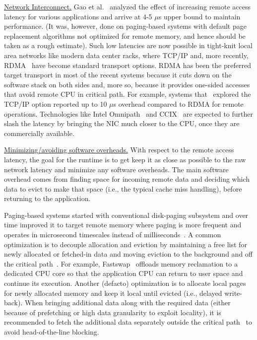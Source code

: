 \vspace{5pt}
\noindent \uline{Network Interconnect.}
Gao et al.~\cite{netdisagg} analyzed the effect of increasing
remote access latency for various applications and arrive at 
4-5 $\mu$s upper bound to maintain performance. (It was, 
however, done on paging-based systems with default page 
replacement algorithms not optimized for remote memory, and 
hence should be taken as a rough estimate).
Such low latencies are now possible in tight-knit
local area networks like modern data center racks,  
where TCP/IP and, more recently, RDMA~\cite{rocev2} have
become standard transport options. 
RDMA has been the preferred target transport 
in most of the recent systems because it cuts down on the 
software stack on both sides and, more so, because it 
provides one-sided accesses that avoid remote CPU in 
critical path. For example, systems that~\cite{literdma,aifm}
explored the TCP/IP option reported up to 10 $\mu$s overhead 
compared to RDMA for remote operations. Technologies 
like Intel Omnipath~\cite{omnipath} and CCIX~\cite{ccix}
are expected to further slash the latency by bringing the NIC 
much closer to the CPU, once they are commercially available. 




\vspace{5pt}
\noindent \uline{Minimizing/avoiding software overheads.}
With respect to the remote access latency, the goal for the 
runtime is to get keep it as close as possible to the raw network 
latency and minimize any software overheads. The main software 
overhead comes from finding space for incoming remote data 
and deciding which data to evict to make that space 
(i.e., the typical cache miss handling), before returning to 
the application. 

Paging-based systems started with conventional disk-paging 
subsystem and over time improved it to target remote memory
where paging is more frequent and operates in microsecond
timescales instead of milliseconds~\cite{Lim2012}. A common 
optimization is to decouple allocation and eviction by 
maintaining a free list for newly allocated or fetched-in 
data and moving eviction to the background and off the 
critical path~\cite{Lim2012,leap}. 
For example, Fastswap~\cite{fastswap} offloads  
memory reclamation to a dedicated CPU core so that the 
application CPU can return to user space and continue its 
execution. Another (defacto) optimization is to allocate local 
pages for newly allocated memory and keep it local until evicted
(i.e., delayed write-back).
When bringing additional data along with the required data
(either because of prefetching or high data granularity to 
exploit locality), it is recommended to fetch the additional 
data separately outside the critical path~\cite{fastswap} to 
avoid head-of-the-line blocking.

